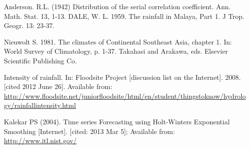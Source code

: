 \documentclass{pshscarc2013}
\begin{document}
\begin{thebibliography}{99\kern\bibindent}
Anderson. R.L. (1942) Distribution of the serial correlation coefficient. Ann. Math. Stat. 13, 1-13.
DALE, W. L. 1959. The rainfall in Malaya, Part 1. J Trop. Geogr. 13: 23-37.

Nieuwolt S. 1981. The climates of Continental Southeast Asia, chapter 1. In: World Survey of Climatology, p. 1-37. Takahasi and Arakawa, eds. Elsevier Scientific Publishing Co.

Intensity of rainfall. In: Floodsite Project [discussion list on the Internet]. 2008. [cited 2012 June 26]. Available from: \url{http://www.floodsite.net/juniorfloodsite/html/en/student/thingstoknow/hydrology/rainfallintensity.html}

 Kalekar PS (2004). Time series Forecasting using Holt-Winters Exponential Smoothing [Internet]. [cited: 2013 Mar 5]; Available from: \url{http://www.itl.nist.gov/}
\end{thebibliography}

\appendix


\end{document}
